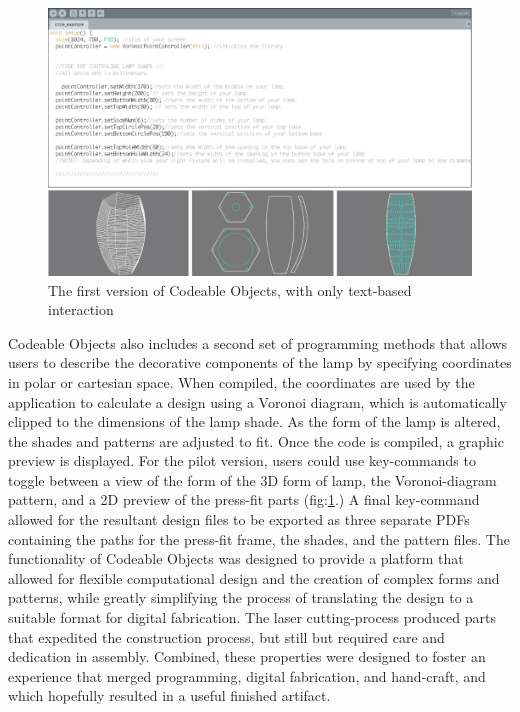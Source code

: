 \begin{center}
\begin{figure}[h!]
\includegraphics[width=\columnwidth]{images/codeable_objects_v1.jpg}
\caption{The first version of Codeable Objects, with only text-based interaction}
\label{fig:codeable_objects_v1}
\end{figure}
\end{center}
\vspace{-20pt}

Codeable Objects also includes a second set of programming methods that allows users to describe the decorative components of the lamp by specifying coordinates in polar or cartesian space. When compiled, the coordinates are used by the application to calculate a design using a Voronoi diagram, which is automatically clipped to the dimensions of the lamp shade. As the form of the lamp is altered, the shades and patterns are adjusted to fit. Once the code is compiled, a graphic preview is displayed. For the pilot version, users could use key-commands to toggle between a view of the form of the 3D form of lamp, the Voronoi-diagram pattern, and a 2D preview of the press-fit parts (fig:\ref{fig:codeable_objects_v1}.) A final key-command allowed for the resultant design files to be exported as three separate PDFs containing the paths for the press-fit frame, the shades, and the pattern files. The functionality of Codeable Objects was designed to provide a platform that allowed for flexible computational design and the creation of complex forms and patterns, while greatly simplifying the process of translating the design to a suitable format for digital fabrication. The laser cutting-process produced parts that expedited the construction process, but still but required care and dedication in assembly. Combined, these properties were designed to foster an experience that merged programming, digital fabrication, and hand-craft, and which hopefully resulted in a useful finished artifact.
		
